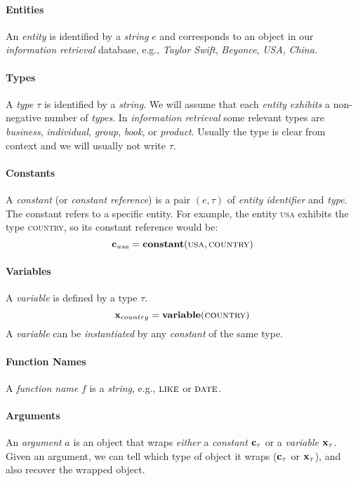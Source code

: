 \documentclass[11pt]{article}
\newcommand{\constant}[1]{{\bf c}_{#1}}
\newcommand{\variable}[1]{{\bf x}_{#1}}
\newcommand{\xvariable}{{\bf x}}
\newcommand{\cvariable}{{\bf c}}
\begin{document}
\paragraph{Entities}
An {\em entity} is identified by a {\em string} $e$ and corresponds to an object in our {\em information retrieval} database, e.g., {\em Taylor Swift}, {\em Beyonce}, {\em USA}, {\em China}.

\paragraph{Types} A {\em type} $\tau$ is identified by a {\em string}.
We will assume that each {\em entity} {\em exhibits} a non-negative number of {\em types}.
In {\em information retrieval} some relevant types are {\em business}, {\em individual}, {\em group}, {\em book}, or {\em product}.
Usually the type is clear from context and we will usually not write $\tau$.

\paragraph{Constants}
A {\em constant} (or {\em constant reference}) is a pair $(e, \tau)$ of {\em entity identifier} and {\em type}.
The constant refers to a specific entity.
For example, the entity \textsc{usa} exhibits the type \textsc{country}, so its constant reference would be:
\begin{equation} \constant{usa} = \textbf{constant}(\textsc{usa}, \textsc{country})\end{equation}

\paragraph{Variables}
A {\em variable} is defined by a type $\tau$.
\begin{equation} \variable{country} = \textbf{variable}(\textsc{country})\end{equation}
A {\em variable} can be {\em instantiated} by any {\em constant} of the same type.

\paragraph{Function Names}
A {\em function name} $f$ is a {\em string}, e.g., $\textsc{like}$ or $\textsc{date}$.

\paragraph{Arguments}
An {\em argument} $a$ is an object that wraps {\em either} a {\em constant} $\cvariable_\tau$ or a {\em variable} $\xvariable_\tau$.
Given an argument, we can tell which type of object it wraps ($\cvariable_\tau$ or $\xvariable_\tau$), and also recover the wrapped object.
\end{document}
